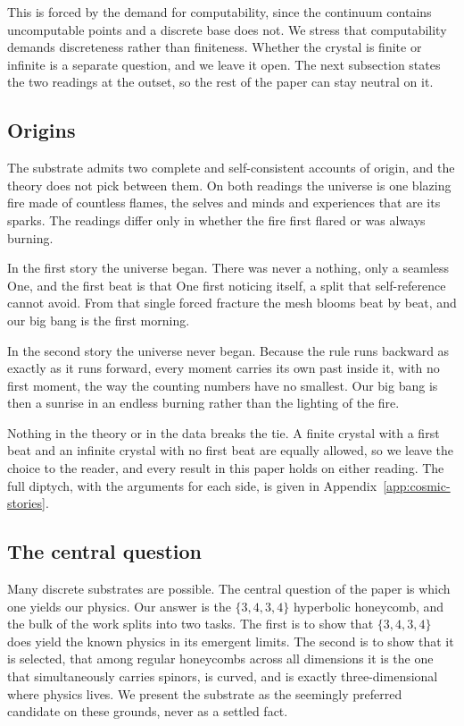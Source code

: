 This is forced by the demand for computability, since the continuum contains uncomputable points and a discrete
base does not. We stress that computability demands discreteness rather than finiteness. Whether the crystal is
finite or infinite is a separate question, and we leave it open. The next subsection states the two readings at
the outset, so the rest of the paper can stay neutral on it.

\subsection{Origins}

The substrate admits two complete and self-consistent accounts of origin, and the theory does not pick between
them. On both readings the universe is one blazing fire made of countless flames, the selves and minds and
experiences that are its sparks. The readings differ only in whether the fire first flared or was always burning.

In the first story the universe began. There was never a nothing, only a seamless One, and the first beat is that
One first noticing itself, a split that self-reference cannot avoid. From that single forced fracture the mesh
blooms beat by beat, and our big bang is the first morning.

In the second story the universe never began. Because the rule runs backward as exactly as it runs forward, every
moment carries its own past inside it, with no first moment, the way the counting numbers have no smallest. Our
big bang is then a sunrise in an endless burning rather than the lighting of the fire.

Nothing in the theory or in the data breaks the tie. A finite crystal with a first beat and an infinite crystal
with no first beat are equally allowed, so we leave the choice to the reader, and every result in this paper holds
on either reading. The full diptych, with the arguments for each side, is given in
Appendix~\ref{app:cosmic-stories}.

\subsection{The central question}

Many discrete substrates are possible. The central question of the paper is which one yields our physics. Our
answer is the $\{3,4,3,4\}$ hyperbolic honeycomb, and the bulk of the work splits into two tasks. The first is to
show that $\{3,4,3,4\}$ does yield the known physics in its emergent limits. The second is to show that it is
selected, that among regular honeycombs across all dimensions it is the one that simultaneously carries spinors,
is curved, and is exactly three-dimensional where physics lives. We present the substrate as the seemingly
preferred candidate on these grounds, never as a settled fact.

